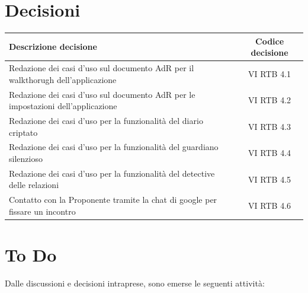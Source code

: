 \documentclass[a4paper,12pt]{article}
\newcommand{\ignoreglossary}{}
\begin{document}
\section{Decisioni}
\begin{center}
\small
\renewcommand{\arraystretch}{1.2} 
\begin{tabular}{|p{}|c|}
\hline
\rowcolor{gray!60} 
\textbf{Descrizione decisione} & \textbf{Codice decisione} \\
\hline
\rowcolor{white}
Redazione dei casi d'uso sul documento AdR per il walkthorugh dell'applicazione & VI \ignoreglossary{RTB} 4.1 \\
\hline
\rowcolor{gray!20}
Redazione dei casi d'uso sul documento AdR per le impostazioni dell'applicazione  &  VI \ignoreglossary{RTB} 4.2 \\
\hline
\rowcolor{white}
Redazione dei casi d'uso per la funzionalità del diario criptato &  VI \ignoreglossary{RTB} 4.3\\
\hline
\rowcolor{gray!20}
Redazione dei casi d'uso per la funzionalità del guardiano silenzioso  & VI \ignoreglossary{RTB} 4.4 \\
\hline
\rowcolor{white}
Redazione dei casi d'uso per la funzionalità del detective delle relazioni  &  VI \ignoreglossary{RTB} 4.5 \\
\hline
\rowcolor{gray!20}
Contatto con la Proponente tramite la chat di google per fissare un incontro  &  VI \ignoreglossary{RTB} 4.6 \\
\hline
\end{tabular}
\end{center}

\section{To Do}
Dalle discussioni e decisioni intraprese, sono emerse le seguenti attività:
\end{document}
